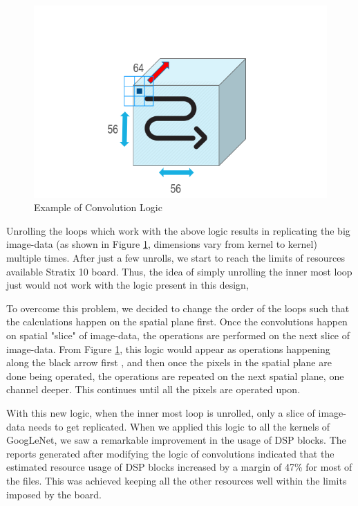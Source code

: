 \begin{figure}[!htb]
  \includegraphics[width=\textwidth,height=\textheight,keepaspectratio]{img/GoogLeNet_Conv_logic.png}
  \caption{Example of Convolution Logic}
  \label{fig:GoogLeNet_Conv_logic}
\end{figure}

Unrolling the loops which work with the above logic results in replicating the big image-data (as shown in Figure \ref{fig:GoogLeNet_Conv_logic}, dimensions vary from kernel to kernel) multiple times. After just a few unrolls, we start to reach the limits of resources available Stratix 10 board. Thus, the idea of simply unrolling the inner most loop just would not work with the logic present in this design,

To overcome this problem, we decided to change the order of the loops such that the calculations happen on the spatial plane first. Once the convolutions happen on spatial "slice" of image-data, the operations are performed on the next slice of image-data. From Figure \ref{fig:GoogLeNet_Conv_logic}, this logic would appear as operations happening along the black arrow first , and then once the pixels in the spatial plane are done being operated, the operations are repeated on the next spatial plane, one channel deeper. This continues until all the pixels are operated upon.  

With this new logic, when the inner most loop is unrolled, only a slice of image-data needs to get replicated. When we applied this logic to all the kernels of GoogLeNet, we saw a remarkable improvement in the usage of DSP blocks. The reports generated after modifying the logic of convolutions indicated that the estimated resource usage of DSP blocks increased by a margin of 47\% for most of the files. This was achieved keeping all the other resources well within the limits imposed by the board. 

